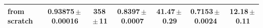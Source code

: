 \begin{landscape}
{\begin{center}
\begin{minipage}{\linewidth}
\begin{tabular*}{\linewidth}{@{\extracolsep{\fill}}lcccccc@{}}
from scratch & 0.93875\,$\pm$\,0.00016 & 358\,$\pm$\,11 & 0.8397\,$\pm$\,0.0007 & 41.47\,$\pm$\,0.29 & 0.7153\,$\pm$\,0.0024 & 12.18\,$\pm$\,0.11 \\
\bottomrule
\end{tabular*}
\end{minipage}
\end{center}
}
\end{landscape}

